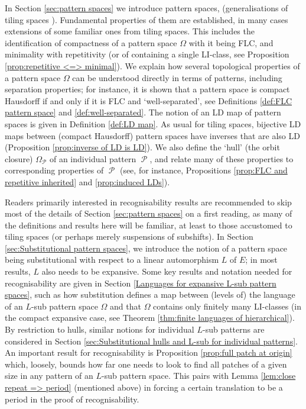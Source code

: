 \documentclass[11pt]{amsart}
\numberwithin{equation}{section}
\theoremstyle{plain}
\theoremstyle{definition}
\DeclareMathOperator{\cP}{\mathcal{P}}
\begin{document}
In Section \ref{sec:pattern spaces} we introduce pattern spaces, (generalisations of tiling spaces \cite{Sad08}). Fundamental properties of them are established, in many cases extensions of some familiar ones from tiling spaces. This includes the identification of compactness of a pattern space \(\Omega\) with it being FLC, and minimality with repetitivity (or of containing a single LI-class, see Proposition \ref{prop:repetitive <=> minimal}). We explain how several topological properties of a pattern space \(\Omega\) can be understood directly in terms of patterns, including separation properties; for instance, it is shown that a pattern space is compact Hausdorff if and only if it is FLC and `well-separated', see Definitions \ref{def:FLC pattern space} and \ref{def:well-separated}. The notion of an LD map of pattern spaces is given in Definition \ref{def:LD map}. As usual for tiling spaces, bijective LD maps between (compact Hausdorff) pattern spaces have inverses that are also LD (Proposition \ref{prop:inverse of LD is LD}). We also define the `hull' (the orbit closure) \(\Omega_{\cP}\) of an individual pattern \(\cP\), and relate many of these properties to corresponding properties of \(\cP\) (see, for instance, Propositions \ref{prop:FLC and repetitive inherited} and \ref{prop:induced LDs}).

Readers primarily interested in recognisability results are recommended to skip most of the details of Section \ref{sec:pattern spaces} on a first reading, as many of the definitions and results here will be familiar, at least to those accustomed to tiling spaces (or perhaps merely suspensions of subshifts). In Section \ref{sec:Substitutional pattern spaces}, we introduce the notion of a pattern space being substitutional with respect to a linear automorphism \(L\) of \(E\); in most results, \(L\) also needs to be expansive. Some key results and notation needed for recognisability are given in Section \ref{Languages for expansive L-sub pattern spaces}, such as how substitution defines a map between (levels of) the language of an \(L\)-sub pattern space \(\Omega\) and that \(\Omega\) contains only finitely many LI-classes (in the compact expansive case, see Theorem \ref{thm:finite languages of hierarchical}). By restriction to hulls, similar notions for individual \(L\)-sub patterns are considered in Section \ref{sec:Substitutional hulls and L-sub for individual patterns}. An important result for recognisability is Proposition \ref{prop:full patch at origin} which, loosely, bounds how far one needs to look to find all patches of a given size in any pattern of an \(L\)-sub pattern space. This pairs with Lemma \ref{lem:close repeat => period} (mentioned above) in forcing a certain translation to be a period in the proof of recognisability.
\end{document}
